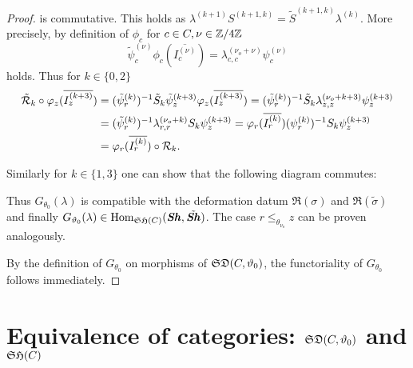 \begin{proof}
        is commutative. 
        This holds as $\lambda^{(k+1)}S^{(k+1,k)} = \tilde{S}^{(k+1,k)}\lambda^{(k)}$. More precisely, by definition of $\phi_c$ for $c \in C, \nu \in \mathbb{Z}/4\mathbb{Z}$ \[ \tilde{\psi}_c^{(\nu)}\phi_c(\overline{I_c^{(\nu)}}) =\lambda_{c,c}^{(\nu_o+\nu)}\psi_c^{(\nu)}\] holds. Thus for $k \in \{0,2\}$
        \begin{align*} 
        \tilde{\mathcal{R}}_k \circ \varphi_z(\overline{I_z^{(k+3)}}) &= (\tilde{\psi}_r^{(k)})^{-1}\tilde{S}_k\tilde{\psi}_z^{(k+3)}\varphi_z(\overline{I_z^{(k+3)}})=(\tilde{\psi}_r^{(k)})^{-1}\tilde{S}_k\lambda_{z,z}^{(\nu_o+k+3)}\psi_z^{(k+3)}  \\ &= (\tilde{\psi}_r^{(k)})^{-1}\lambda_{r,r}^{(\nu_o+k)}S_k\psi_z^{(k+3)} = \varphi_r(\overline{I_r^{(k)}})(\psi_r^{(k)})^{-1}S_k\psi_z^{(k+3)} \\
        & = \varphi_r(\overline{I_r^{(k)}})\circ \mathcal{R}_k.
        \end{align*}

        Similarly for $k \in \{1,3\}$ one can show that the following diagram commutes:

        \begin{center}
    \end{center}
    
    
        
    Thus $G_{\theta_0}(\lambda)$ is compatible with the deformation datum $\mathfrak{R}(\sigma)$ and $\mathfrak{R}(\tilde{\sigma})$ and finally $G_{\vartheta_0}(\lambda) \in \operatorname{Hom}_{\mathfrak{SH}(C)}(\bm{\mathit{Sh}},\tilde{\bm{\mathit{Sh}}})$. 
    The case $r \leq_{\theta_{\nu_o}} z$ can be proven analogously.
    
    By the definition of $G_{\theta_0}$ on morphisms of $\mathfrak{SD}(C,\vartheta_0)$, the functoriality of $G_{\theta_0}$ follows immediately.  
\end{proof}


\section{Equivalence of categories: $\mathfrak{SD}(C,\vartheta_0)$ and $\mathfrak{SH}(C)$}

